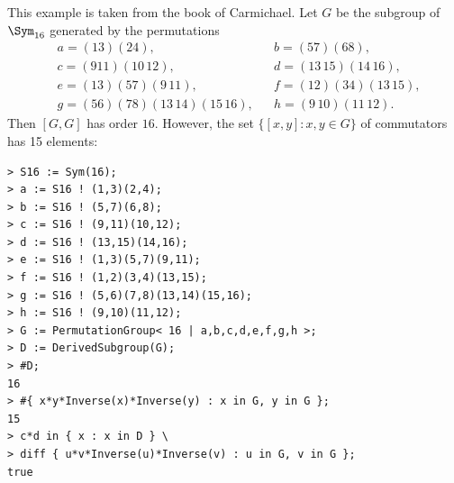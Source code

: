 \begin{example}
This example is taken from the book \cite{MR0075938} of Carmichael. 
Let $G$ be the subgroup of $\Sym_{16}$ generated by the permutations
\begin{align*}
&a = (1 3)(2 4),&&
b = (5 7)(6 8),\\
&c = (9 11)(10\,12),&&
d = (13\,15)(14\,16),\\
&e = (1 3)(5 7)(9\,11),&&
f = (1 2)(3 4)(13\,15),\\
&g = (5 6)(7 8)(13\,14)(15\,16),&&
h =(9\,10)(11\,12).
\end{align*}
Then $[G,G]$ has order $16$. However, 
the set $\{[x,y]:x,y\in G\}$ of commutators has 15 elements:
\begin{lstlisting}
> S16 := Sym(16);
> a := S16 ! (1,3)(2,4);
> b := S16 ! (5,7)(6,8);
> c := S16 ! (9,11)(10,12);
> d := S16 ! (13,15)(14,16);
> e := S16 ! (1,3)(5,7)(9,11);
> f := S16 ! (1,2)(3,4)(13,15);
> g := S16 ! (5,6)(7,8)(13,14)(15,16);
> h := S16 ! (9,10)(11,12);
> G := PermutationGroup< 16 | a,b,c,d,e,f,g,h >;
> D := DerivedSubgroup(G);
> #D;
16
> #{ x*y*Inverse(x)*Inverse(y) : x in G, y in G };
15
> c*d in { x : x in D } \
> diff { u*v*Inverse(u)*Inverse(v) : u in G, v in G };
true
\end{lstlisting}







   




\end{example}


